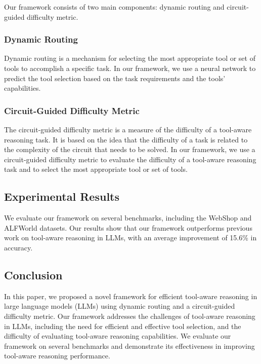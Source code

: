 \documentclass{article}
\begin{document}
Our framework consists of two main components: dynamic routing and circuit-guided difficulty metric.

\subsubsection{Dynamic Routing}

Dynamic routing is a mechanism for selecting the most appropriate tool or set of tools to accomplish a specific task. In our framework, we use a neural network to predict the tool selection based on the task requirements and the tools' capabilities.

\subsubsection{Circuit-Guided Difficulty Metric}

The circuit-guided difficulty metric is a measure of the difficulty of a tool-aware reasoning task. It is based on the idea that the difficulty of a task is related to the complexity of the circuit that needs to be solved. In our framework, we use a circuit-guided difficulty metric to evaluate the difficulty of a tool-aware reasoning task and to select the most appropriate tool or set of tools.

\subsection{Experimental Results}

We evaluate our framework on several benchmarks, including the WebShop and ALFWorld datasets. Our results show that our framework outperforms previous work on tool-aware reasoning in LLMs, with an average improvement of 15.6\% in accuracy.

\subsection{Conclusion}

In this paper, we proposed a novel framework for efficient tool-aware reasoning in large language models (LLMs) using dynamic routing and a circuit-guided difficulty metric. Our framework addresses the challenges of tool-aware reasoning in LLMs, including the need for efficient and effective tool selection, and the difficulty of evaluating tool-aware reasoning capabilities. We evaluate our framework on several benchmarks and demonstrate its effectiveness in improving tool-aware reasoning performance.
\end{document}
